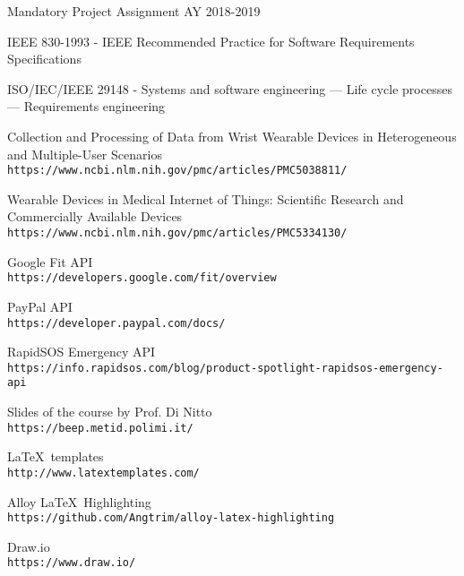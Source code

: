 \begin{thebibliography}{9}
   Mandatory Project Assignment AY 2018-2019

   IEEE 830-1993 - IEEE Recommended Practice for Software Requirements Specifications

   ISO/IEC/IEEE 29148 - Systems and software engineering — Life cycle processes — Requirements engineering

   Collection and Processing of Data from Wrist Wearable Devices in Heterogeneous and Multiple-User Scenarios\\
  \texttt{https://www.ncbi.nlm.nih.gov/pmc/articles/PMC5038811/}

   Wearable Devices in Medical Internet of Things: Scientific Research and Commercially Available Devices\\
  \texttt{https://www.ncbi.nlm.nih.gov/pmc/articles/PMC5334130/}

   Google Fit API\\
  \texttt{https://developers.google.com/fit/overview}

   PayPal API\\
  \texttt{https://developer.paypal.com/docs/}

   RapidSOS Emergency API\\
  \texttt{https://info.rapidsos.com/blog/product-spotlight-rapidsos-emergency-api}

  Slides of the course by Prof. Di Nitto\\
  \texttt{https://beep.metid.polimi.it/}

  \LaTeX\ templates\\
  \texttt{http://www.latextemplates.com/}

  Alloy \LaTeX\ Highlighting\\
  \texttt{https://github.com/Angtrim/alloy-latex-highlighting}

  Draw.io\\
  \texttt{https://www.draw.io/}


\end{thebibliography}
